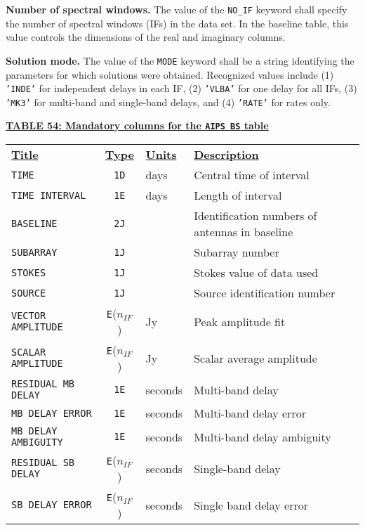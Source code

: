 \documentclass[twoside]{article}
\newcommand{\nif}{$n_{IF}$}
\begin{document}
{\bf Number of spectral windows.} The value of the {\tt NO\_IF}
keyword shall specify the number of spectral windows (IFs) in the data
set.  In the baseline table, this value controls the dimensions of the
real and imaginary columns.

{\bf Solution mode.} The value of the {\tt MODE} keyword shall be a
string identifying the parameters for which solutions were obtained.
Recognized values include (1) {\tt 'INDE'} for independent delays in
each IF, (2) {\tt 'VLBA'} for one delay for all IFs, (3) {\tt 'MK3'}
for multi-band and single-band delays, and (4) {\tt 'RATE'} for rates
only.

\begin{center}
\underline{\bf{TABLE 54: Mandatory columns for the {\tt AIPS BS} table}}\\
\begin{tabular}{lcll}
\noalign{\vspace{2pt}} \label{ta:BScols}
\underline{{\bf Title\vphantom{y}}} & \underline{\bf{Type}} &
   \underline{{\bf Units\vphantom{y}}} & \underline{\bf{Description}} \\
\noalign{\vspace{2pt}}
{\tt TIME}          & {\tt 1D} & days & Central time of interval \\
{\tt TIME INTERVAL} & {\tt 1E} & days & Length of interval \\
{\tt BASELINE}      & {\tt 2J} &      & Identification numbers of antennas in baseline \\
{\tt SUBARRAY}      & {\tt 1J} &      & Subarray number \\
{\tt STOKES}        & {\tt 1J} &      & Stokes value of data used \\
{\tt SOURCE}        & {\tt 1J} &      & Source identification number \\
{\tt VECTOR AMPLITUDE}      & {\tt E}(\nif) & Jy & Peak amplitude fit \\
{\tt SCALAR AMPLITUDE}      & {\tt E}(\nif) & Jy & Scalar average amplitude \\
{\tt RESIDUAL MB DELAY}     & {\tt 1E}      & seconds & Multi-band delay \\
{\tt MB DELAY ERROR}        & {\tt 1E}      & seconds & Multi-band delay error \\
{\tt MB DELAY AMBIGUITY}    & {\tt 1E}      & seconds & Multi-band delay ambiguity \\
{\tt RESIDUAL SB DELAY}     & {\tt E}(\nif) & seconds & Single-band delay \\
{\tt SB DELAY ERROR}        & {\tt E}(\nif) & seconds & Single band delay error \\

\end{tabular}
\end{center}
\end{document}
